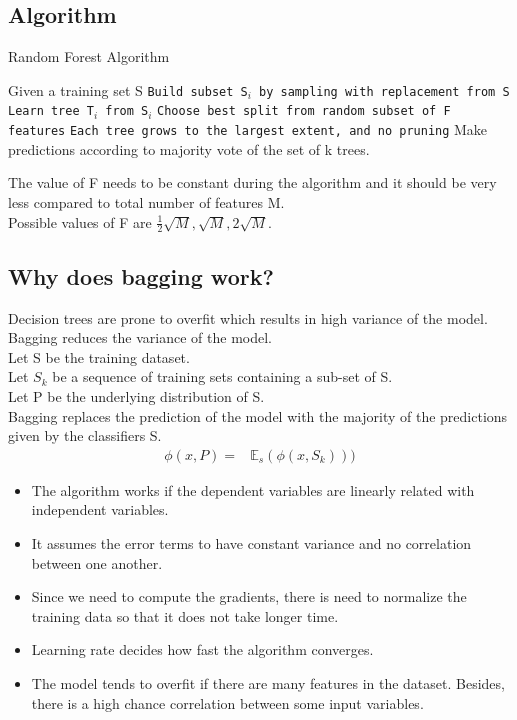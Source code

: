 \documentclass[12pt,letterpaper, onecolumn]{exam}
\begin{document}
\subsection*{Algorithm}
\begin{algorithm}
\caption{Random Forest Algorithm}\label{cap}
\begin{algorithmic}

\State Given a training set S
        \State \texttt{Build subset S$_i$ by sampling with replacement from S}
        \State \texttt{Learn tree T$_i$
from S$_i$}
\State \texttt{Choose best split from random subset of F features}
\State \texttt{Each tree grows to the largest extent, and no pruning}
\EndFor
      \EndFor
\State Make predictions according to majority vote of the set of k trees.
\end{algorithmic}
\end{algorithm}

The value of F needs to be constant during the algorithm and it should be very less compared to total number of features M.
\\Possible values of F are $\frac{1}{2}\sqrt{M},\sqrt{M},2\sqrt{M}$.



\subsection*{Why does bagging work?}
Decision trees are prone to overfit which results in high variance of the model. Bagging reduces the variance of the model.\\
Let S be the training dataset. \\
Let ${S_k}$ be a sequence of training sets containing a sub-set of S.\\
 Let P be the underlying distribution of S.\\
Bagging replaces the prediction of the model with the majority of 
the predictions given by the classifiers S.
\begin{align}
\phi(x,P) = {}& \mathbb{E}_s(\phi(x,S_k)))
\end{align}


\begin{itemize}
\item The algorithm works if the dependent variables are linearly related with independent variables.
\item It assumes the error terms to have constant variance and no correlation between one another.
\item Since we need to compute the gradients, there is need to normalize the training data so that it does not take longer time.
\item Learning rate decides how fast the algorithm converges.
\item The model tends to overfit if there are many features in the dataset. Besides, there is a high chance correlation between some input variables.
\end{itemize}
\end{document}
